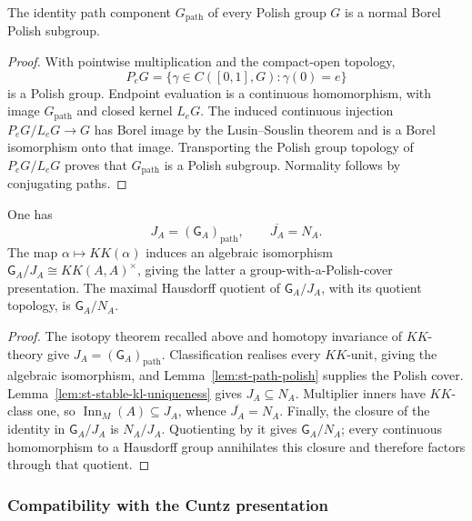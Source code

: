 \begin{lemma}\label{lem:st-path-polish}
 The identity path component $G_{\mathrm{path}}$ of
every Polish group $G$ is a normal Borel Polish subgroup.
\end{lemma}

\begin{proof}
With pointwise multiplication and the compact-open topology, 
\begin{equation*}
P_eG=\{\gamma\in C([0,1],G):\gamma(0)=e\} 
\end{equation*}
is a Polish group. Endpoint evaluation is a continuous homomorphism, with
image $G_{\mathrm{path}}$ and closed kernel $L_eG$. The induced continuous
injection $P_eG/L_eG\to G$ has Borel image by the Lusin--Souslin theorem and
is a Borel isomorphism onto that image. Transporting the Polish group
topology of $P_eG/L_eG$ proves that $G_{\mathrm{path}}$ is a Polish
subgroup. Normality follows by conjugating paths.
\end{proof}

\begin{proposition}\label{prop:st-kk-path-cover}
 One has 
\begin{equation*}
J_A=(\mathsf G_A)_{\mathrm{path}},\qquad \overline{J_A}=N_A. 
\end{equation*}
The map $\alpha\mapsto KK(\alpha)$ induces an algebraic isomorphism $\mathsf G_A/J_A\cong KK(A,A)^\times$, giving the latter a group-with-a-Polish-cover
presentation. The maximal Hausdorff quotient of $\mathsf G_A/J_A$, with its quotient
topology, is $\mathsf G_A/N_A$.
\end{proposition}

\begin{proof}
The isotopy theorem recalled above and homotopy invariance of $KK$-theory
give $J_A=(\mathsf G_A)_{\mathrm{path}}$. Classification realises every $KK$-unit,
giving the algebraic isomorphism, and Lemma~\ref{lem:st-path-polish} supplies
the Polish cover. Lemma~\ref{lem:st-stable-kl-uniqueness} gives $J_A\subseteq
N_A$. Multiplier inners have $KK$-class one, so $\operatorname{Inn}_M(A)\subseteq J_A$,
whence $\overline{J_A}=N_A$. Finally, the closure of the identity in $\mathsf G_A/J_A
$ is $N_A/J_A$. Quotienting by it gives $\mathsf G_A/N_A$; every continuous
homomorphism to a Hausdorff group annihilates this closure and therefore
factors through that quotient.
\end{proof}


\subsubsection{Compatibility with the Cuntz presentation}

